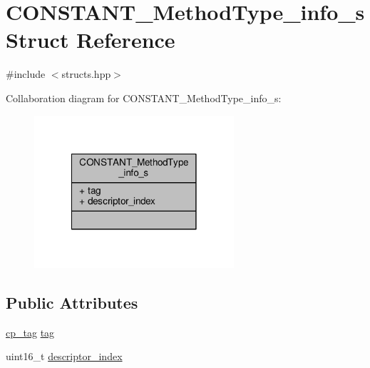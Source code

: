 \hypertarget{structCONSTANT__MethodType__info__s}{\section{C\+O\+N\+S\+T\+A\+N\+T\+\_\+\+Method\+Type\+\_\+info\+\_\+s Struct Reference}
\label{structCONSTANT__MethodType__info__s}
}


{\ttfamily \#include $<$structs.\+hpp$>$}



Collaboration diagram for C\+O\+N\+S\+T\+A\+N\+T\+\_\+\+Method\+Type\+\_\+info\+\_\+s\+:\nopagebreak
\begin{figure}[H]
\begin{center}
\leavevmode
\includegraphics[width=210pt]{structCONSTANT__MethodType__info__s__coll__graph}
\end{center}
\end{figure}
\subsection*{Public Attributes}
\begin{DoxyCompactItemize}
\item 
\hyperlink{structs_8hpp_a17947ec3f3c1f2392eabd36c1ba5fec6}{cp\+\_\+tag} \hyperlink{structCONSTANT__MethodType__info__s_a0218ac52c1a8a8eebd94e09eda7949c6}{tag}
\item 
uint16\+\_\+t \hyperlink{structCONSTANT__MethodType__info__s_afb5f88f171fd11196c453eedceb70117}{descriptor\+\_\+index}
\end{DoxyCompactItemize}



